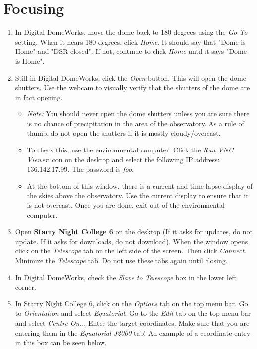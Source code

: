 \documentclass[11pt]{report}
\begin{document}
\section{Focusing}

\begin{enumerate}
\item In Digital DomeWorks, move the dome back to 180 degrees using the \emph{Go To} setting. When it nears 180 degrees, click \emph{Home}. It should say that "Dome is Home" and "DSR closed". If not, continue to click \emph{Home} until it says "Dome is Home".
\item Still in Digital DomeWorks, click the \emph{Open} button. This will open the dome shutters. Use the webcam to visually verify that the shutters of the dome are in fact opening.
\begin{itemize}
\item\emph{Note:} You should never open the dome shutters unless you are sure there is no chance of precipitation in the area of the observatory. As a rule of thumb, do not open the shutters if it is mostly cloudy/overcast.
\item To check this, use the environmental computer. Click the \emph{Run VNC Viewer} icon on the desktop and select the following IP address: 136.142.17.99. The password is \emph{foo}.
\item At the bottom of this window, there is a current and time-lapse display of the skies above the observatory. Use the current display to ensure that it is not overcast. Once you are done, exit out of the environmental computer.
\end{itemize}
\item Open {\bf Starry Night College 6} on the desktop (If it asks for updates, do not update. If it asks for downloads, do not download). When the window opens click on the \emph{Telescope} tab on the left side of the screen. Then click \emph{Connect}. Minimize the \emph{Telescope} tab. Do not use these tabs again until closing.
\item In Digital DomeWorks, check the \emph{Slave to Telescope} box in the lower left corner.
\item In Starry Night College 6, click on the \emph{Options} tab on the top menu bar. Go to \emph{Orientation} and select \emph{Equatorial}. Go to the \emph{Edit} tab on the top menu bar and select \emph{Centre On...} Enter the target coordinates. Make sure that you are entering them in the \emph{Equatorial J2000} tab! An example of a coordinate entry in this box can be seen below.

\end{enumerate}
\end{document}
